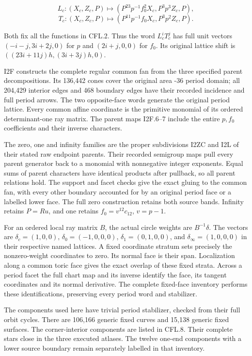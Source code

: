 \[
 L_c:(X_c,Z_c,P)\longmapsto
 (P^{23}p^{-1}f_0^2X_c,P^3p^3Z_c,P),
\]
\[
 T_c:(X_c,Z_c,P)\longmapsto
 (P^{11}p^{-1}f_0X_c,P^3p^2Z_c,P).
 \tag{CFL.3}
\]

Both fix all the functions in CFL.2. Thus the word \(L_c^iT_c^j\)
has full unit vectors
\((-i-j,3i+2j,0)\) for \(p\) and \((2i+j,0,0)\) for \(f_0\).
Its original lattice shift is
\(((23i+11j)h,(3i+3j)h,0)\).

I2F constructs the complete regular common fan from the three
specified parent decompositions. Its 136,442 cones cover the
original area -36 period domain; all 204,429 interior edges and
468 boundary edges have their recorded incidence and full period
arrows. The two opposite-face words generate the original period
lattice. Every common affine coordinate is the primitive monomial
of its ordered determinant-one ray matrix. The parent maps
I2F.6--7 include the entire \(p,f_0\) coefficients and their inverse
characters.

The zero, one and infinity families are the proper subdivisions
I2ZC and I2L of their stated raw endpoint parents. Their recorded
semigroup maps pull every parent generator back to a monomial
with nonnegative integer exponents. Equal sums of parent
characters have identical products after pullback, so all parent
relations hold. The support and facet checks give the exact
gluing to the common fan, with every other boundary accounted
for by an original period face or a labelled lower face.
The full zero construction retains both source bands. Infinity
retains \(P=Ru\), and one retains \(f_0=v^{12}c_{12}\), \(v=p-1\).

For an ordered local ray matrix \(B\), the actual circle weights
are \(B^{-1}\delta\). The vectors are
\(\delta_c=(1,0,0)\), \(\delta_0=(-1,0,0,0)\),
\(\delta_1=(0,1,0,0)\), and \(\delta_\infty=(1,0,0,0)\)
in their respective named lattices. A fixed coordinate stratum
sets precisely the nonzero-weight coordinates to zero. Its
normal face is their span. Localization along a common toric
face gives the exact overlap of these fixed strata. Across a
period facet the full chart map and its inverse identify the
face, its tangent coordinates and its normal derivative. The
complete fixed-face inventory performs these identifications,
preserving every period word and stabilizer.

The components used here have trivial period stabilizer, checked
from their full orbit cycles. There are 106,166 generic fixed
curves and 15,138 generic fixed surfaces. The corner-interior
components are listed in CFL.8. Their complete stars close in the
three executed atlases. The twelve one-end components with a
lower source boundary remain separately labelled in that inventory.

